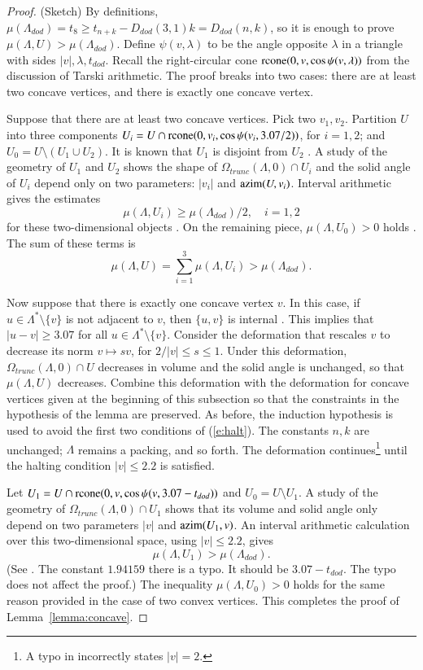 \documentclass{article} %
\begin{document}
\begin{proof} (Sketch)  By definitions,
$\mu(\Lambda_{dod}) = t_8 \ge t_{n+k} - D_{dod}(3,1)k = D_{dod}(n,k)$, so it is
enough to prove $\mu(\Lambda,U) > \mu(\Lambda_{dod})$. 
Define $\psi(v,\lambda)$ to be the angle opposite $\lambda$ in a triangle with sides $|v|,\lambda,t_{dod}$.  Recall the right-circular cone 
${\operatorname{rcone}}(0,v,\cos\psi(v,\lambda))$ from the discussion of Tarski arithmetic.
The proof breaks into two
cases: there are at least two concave vertices, and there is exactly one concave vertex.

Suppose that there are at least two concave vertices.  Pick two $v_1,v_2$.
Partition $U$ into three
components $U_i = U\cap {\operatorname{rcone}}(0,v_i,\cos\psi(v_i,3.07/2))$, for $i=1,2$; and
$U_0= U\setminus (U_1\cup U_2)$.  It is known that
$U_1$ is disjoint from $U_2$ \cite[Lemma~3.7]{Hales:2002:Dodec}.   A  study of the geometry
of $U_1$ and $U_2$ shows the shape of $\Omega_{trunc}(\Lambda,0)\cap U_i$ and the
solid angle of $U_i$ depend only
on two parameters: $|v_i|$ and ${\operatorname{azim}}(U,v_i)$.  Interval arithmetic gives
the estimates
  $$\mu(\Lambda,U_i) \ge \mu(\Lambda_{dod})/2,\quad i=1,2$$
for these two-dimensional objects \cite[\S7.2.6]{Hales:2002:Dodec}.  On the remaining piece, $\mu(\Lambda,U_0)>0$ holds
\cite[p.138]{Hales:2006:DCG}.  The sum of these terms is
  $$
  \mu(\Lambda,U) = \sum_{i=1}^3 \mu(\Lambda,U_i) > \mu(\Lambda_{dod}).
  $$

Now suppose that there is exactly one concave vertex $v$.  In this case, if $u\in\Lambda^*\setminus\{v\}$
is not adjacent to $v$, then $\{u,v\}$ is internal \cite[p.140]{Hales:2006:DCG}.  This implies
that $|u-v|\ge 3.07$ for all $u\in\Lambda^*\setminus\{v\}$.
Consider the deformation that rescales $v$ to decrease its norm $v\mapsto s v$, for 
$2/|v|\le s\le 1$. Under this deformation, $\Omega_{trunc}(\Lambda,0)\cap U$ decreases
in volume and the solid angle is unchanged, so that $\mu(\Lambda,U)$ decreases.
Combine this deformation with the deformation for concave vertices given at the beginning of this subsection so that the
constraints in the hypothesis of the lemma are preserved.  As before, the induction
hypothesis is used to avoid the first two conditions of (\ref{e:halt}).
The constants $n,k$ are unchanged; $\Lambda$ remains a packing, and so forth.
The deformation continues\footnote{A typo in \cite{Hales:2002:Dodec}  incorrectly states $|v|=2$.} until the halting condition $|v|\le 2.2$ is satisfied. 

Let $U_1 = U\cap {\operatorname{rcone}}(0,v,\cos\psi(v,3.07-t_{dod}))$ and $U_0 = U
\setminus U_1$.  A study of the geometry of $\Omega_{trunc}(\Lambda,0)
\cap U_1$ shows that its volume and solid angle only depend 
on two parameters $|v|$ and
${\operatorname{azim}}(U_1,v)$.  An interval arithmetic calculation over this
two-dimensional space, using $|v|\le 2.2$, gives
$$
\mu(\Lambda,U_1) > \mu(\Lambda_{dod}).
$$
(See \cite[\S7.2.6]{Hales:2002:Dodec}. The constant $1.94159$ there  is a typo.
It should be $3.07-t_{dod}$.  The typo does not affect the proof.)
The inequality $\mu(\Lambda,U_0)>0$ holds for the same reason provided
in the case of two convex vertices.  This completes
the proof of Lemma~\ref{lemma:concave}.


\end{proof}
\end{document}
